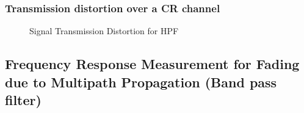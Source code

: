 \documentclass[a4paper, 12pt, english]{article}
\begin{document}
\subsubsection{Transmission distortion over a CR channel}

\begin{figure}[!ht]
	\centering
	\qquad
	\qquad
	\caption{Signal Transmission Distortion for HPF}
	\label{fig:STDHPF}
\end{figure}


\subsection{Frequency Response Measurement for Fading due to Multipath Propagation (Band pass filter)}

\end{document}
